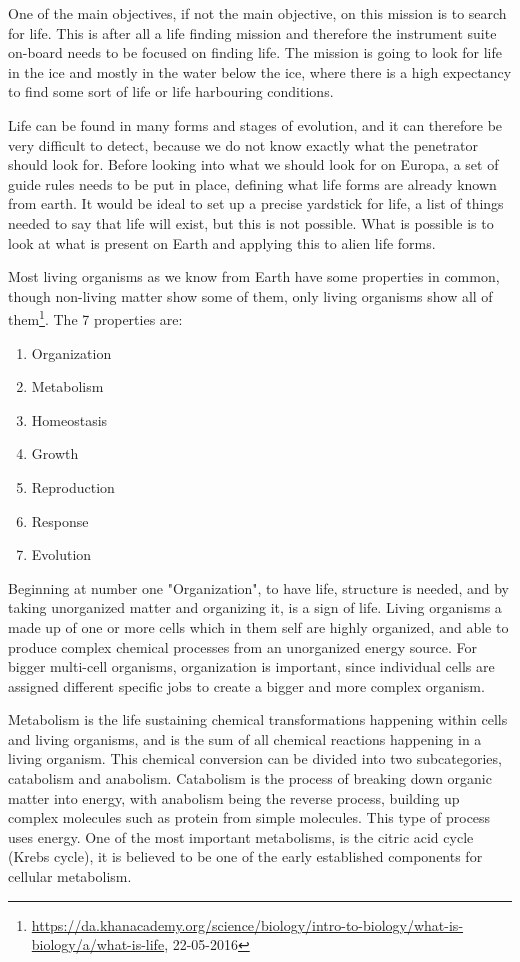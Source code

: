 
One of the main objectives, if not the main objective, on this mission is to search for life. This is after all a life finding mission and therefore the instrument suite on-board needs to be focused on finding life. The mission is going to look for life in the ice and mostly in the water below the ice, where there is a high expectancy to find some sort of life or life harbouring conditions.

Life can be found in many forms and stages of evolution, and it can therefore be very difficult to detect, because we do not know exactly what the penetrator should look for. Before looking into what we should look for on Europa, a set of guide rules needs to be put in place, defining what life forms are already known from earth. It would be ideal to set up a precise yardstick for life, a list of things needed to say that life will exist, but this is not possible. What is possible is to look at what is present on Earth and applying this to alien life forms.

Most living organisms as we know from Earth have some properties in common, though non-living matter show some of them, only living organisms show all of them\footnote{\url{https://da.khanacademy.org/science/biology/intro-to-biology/what-is-biology/a/what-is-life}, 22-05-2016}. The 7 properties are:
\begin{enumerate}
  \item Organization
  \item Metabolism
  \item Homeostasis
  \item Growth
  \item Reproduction
  \item Response
  \item Evolution
\end{enumerate}
Beginning at number one "Organization", to have life, structure is needed, and by taking unorganized matter and organizing it, is a sign of life. Living organisms a made up of one or more cells which in them self are highly organized, and able to produce complex chemical processes from an unorganized energy source. For bigger multi-cell organisms, organization is important, since individual cells are assigned different specific jobs to create a bigger and more complex organism.

Metabolism is the life sustaining chemical transformations happening within cells and living organisms, and is the sum of all chemical reactions happening in a living organism. This chemical conversion can be divided into two subcategories, catabolism and anabolism. Catabolism is the process of breaking down organic matter into energy, with anabolism being the reverse process, building up complex molecules such as protein from simple molecules. This type of process uses energy. One of the most important metabolisms, is the citric acid cycle (Krebs cycle), it is believed to be one of the early established components for cellular metabolism.

